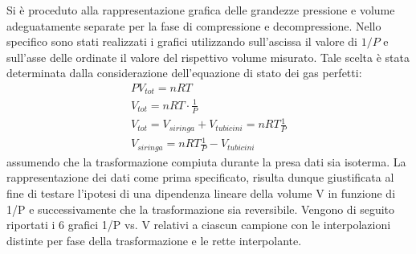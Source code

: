 \documentclass[a4paper,11pt,oneside]{article}
\begin{document}

Si è proceduto alla rappresentazione grafica delle grandezze pressione e volume adeguatamente separate per la fase di compressione e decompressione. Nello specifico sono stati realizzati i grafici utilizzando sull'ascissa il valore di $1/P$ e sull'asse delle ordinate il valore del rispettivo volume misurato. Tale scelta è stata determinata dalla considerazione dell'equazione di stato dei gas perfetti:
\begin{gather*}
    PV_{tot} = n R T \\
    V_{tot}= n R T \cdot \frac{1}{P}\\
    V_{tot}=V_{siringa}+V_{tubicini}=n R T \frac{1}{P}\\
    V_{siringa}=n R T \frac{1}{P} - V_{tubicini}
\end{gather*}
assumendo che la trasformazione compiuta durante la presa dati sia isoterma. La rappresentazione dei dati come prima specificato, risulta dunque giustificata al fine di testare l'ipotesi di una dipendenza lineare della volume V in funzione di 1/P e successivamente che la trasformazione sia reversibile.
Vengono di seguito riportati i 6 grafici 1/P vs. V relativi a ciascun campione con le interpolazioni distinte per fase della trasformazione e le rette interpolante.

\begin{figure}
    \centering
    \newline
    \newline
    \label{fig:my_label}
\end{figure}
\end{document}

